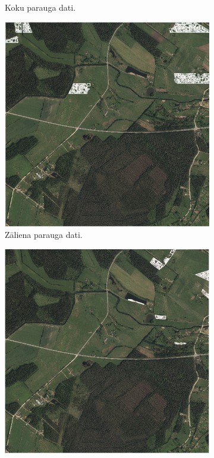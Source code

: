\documentclass[12pt,paper=a4]{report}
\begin{document}
\begin{figure}[h!]
\begin{subfigure}[b]{.32\linewidth}
\caption{Koku parauga dati.}\label{fig:kokiSampleNN}
\end{subfigure}
\begin{subfigure}[b]{.32\linewidth}
\includegraphics[width=\linewidth]{zaliensSampleNN}
\caption{Zāliena parauga dati.}
\label{fig:zaliensSampleNN}
\end{subfigure}
\begin{subfigure}[b]{.32\linewidth}
\includegraphics[width=\linewidth]{lauksSampleNN}

\end{subfigure}
\end{figure}
\end{document}

